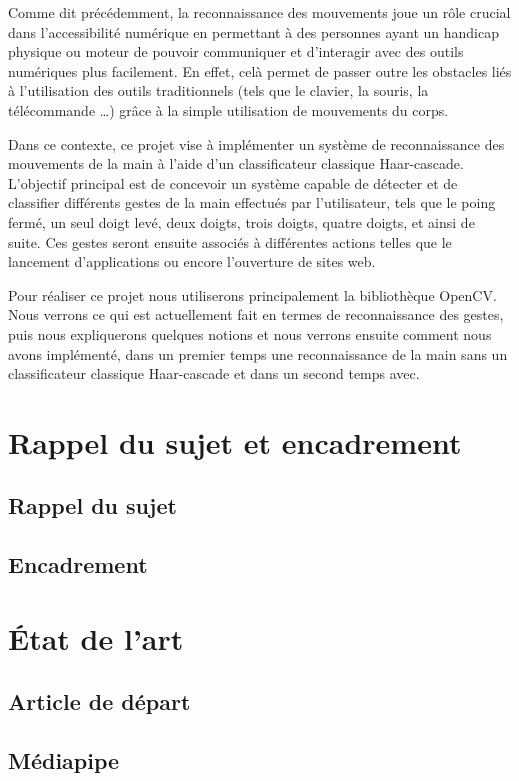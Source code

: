 \documentclass[11pt]{article}
\begin{document}
Comme dit précédemment, la reconnaissance des mouvements joue un rôle crucial dans l’accessibilité numérique en permettant à des personnes ayant un handicap physique  ou moteur de pouvoir communiquer et d'interagir avec des outils numériques plus facilement. En effet, celà permet de passer outre les obstacles liés à l’utilisation des outils traditionnels (tels que le clavier, la souris, la télécommande …) grâce à la simple utilisation de mouvements du corps. \bigbreak

Dans ce contexte, ce projet vise à implémenter un système de reconnaissance des mouvements de la main à l’aide d’un classificateur classique Haar-cascade. 
L'objectif principal est de concevoir un système capable de détecter et de classifier différents gestes de la main effectués par l'utilisateur, 
tels que le poing fermé, un seul doigt levé, deux doigts, trois doigts, quatre doigts, et ainsi de suite. Ces gestes seront ensuite associés à différentes 
actions telles que le lancement d'applications ou encore l'ouverture de sites web. \bigbreak

Pour réaliser ce projet nous utiliserons principalement la bibliothèque OpenCV. Nous verrons ce qui est actuellement fait en termes de reconnaissance des 
gestes, puis nous expliquerons quelques notions et nous verrons ensuite comment nous avons implémenté, dans un premier temps une reconnaissance de la main 
sans un classificateur classique Haar-cascade et dans un second temps avec.

\newpage

\section{Rappel du sujet et encadrement}
\subsection{Rappel du sujet}
\subsection{Encadrement}
\newpage

\section{\'Etat de l'art}
\subsection{Article de départ}
\subsection{Médiapipe}
\end{document}
